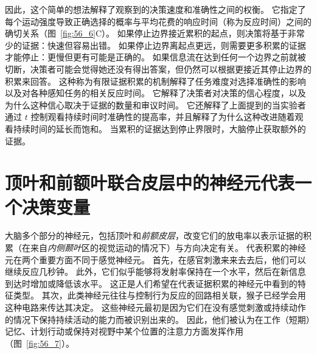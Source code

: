 因此，这个简单的想法解释了观察到的决策速度和准确性之间的权衡。
它指定了每个运动强度导致正确选择的概率与平均花费的响应时间（称为反应时间）之间的确切关系（图~\ref{fig:56_6}C）。
如果停止边界接近累积的起点，则决策将基于非常少的证据：快速但容易出错。
如果停止边界离起点更远，则需要更多积累的证据才能停止：更慢但更有可能是正确的。
如果信息流在达到任何一个边界之前就被切断，决策者可能会觉得她还没有得出答案，但仍然可以根据更接近其停止边界的积累来回答。
这种称为有限证据积累的机制解释了任务难度对选择准确性的影响以及对各种感知任务的相关反应时间。
它解释了决策者对决策的信心程度，以及为什么这种信心取决于证据的数量和审议时间。
它还解释了上面提到的当实验者通过 $ t $ 控制观看持续时间时准确性的提高率，并且解释了为什么这种改进随着观看持续时间的延长而饱和。
当累积的证据达到停止界限时，大脑停止获取额外的证据。



\section{顶叶和前额叶联合皮层中的神经元代表一个决策变量}

大脑多个部分的神经元，包括顶叶和\textit{前额皮层}，改变它们的放电率以表示证据的积累（在来自\textit{内侧颞叶}区的视觉运动的情况下）与方向决定有关。
代表积累的神经元在两个重要方面不同于感觉神经元。
首先，在感官刺激来来去去后，他们可以继续反应几秒钟。
此外，它们似乎能够将发射率保持在一个水平，然后在新信息到达时增加或降低该水平。
这正是人们希望在代表证据积累的神经元中看到的特征类型。
其次，此类神经元往往与控制行为反应的回路相关联，猴子已经学会用这种电路来传达其决定。
这些神经元最初是因为它们在没有感觉刺激或持续动作的情况下保持持续活动的能力而被识别出来的。
因此，他们被认为在工作（短期）记忆、计划行动或保持对视野中某个位置的注意力方面发挥作用（图~\ref{fig:56_7}）。


